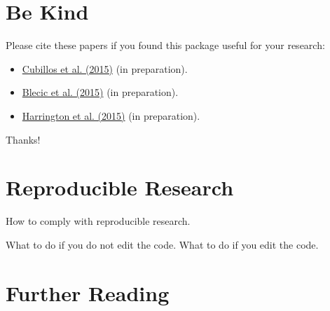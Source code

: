 \documentclass[letterpaper, 12pt]{article}
\begin{document}
\section{Be Kind}
\label{sec:bekind}
Please cite these papers if you found this package useful for your
research:
\begin{itemize}
\item \href{https://github.com/exosports/transit}{Cubillos et
    al. (2015)} (in preparation).

\item \href{https://github.com/dzesmin/}{Blecic et al. (2015)} (in
  preparation).
\item \href{https://github.com/dzesmin/}{Harrington et al. (2015)} (in
  preparation).
\end{itemize}
Thanks!

\section{Reproducible Research}

How to comply with reproducible research.

What to do if you do not edit the code.
What to do if you edit the code.


\section{Further Reading}
\label{sec:furtherreading}


\end{document}
